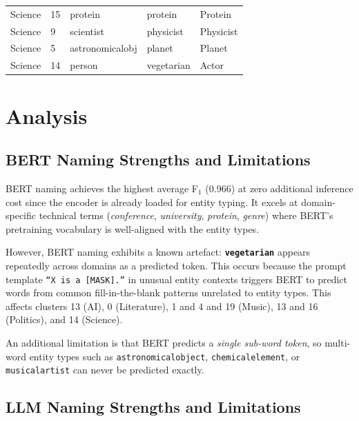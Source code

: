 \documentclass[11pt,a4paper]{article}
\begin{document}
\begin{table}[h]
\begin{tabularx}{\textwidth}{l l X X X}
\midrule
Science    & 15 & protein        & \textcolor{green!60!black}{protein}        & \textcolor{green!60!black}{Protein} \\
Science    & 9  & scientist      & \textcolor{green!60!black}{physicist}      & \textcolor{green!60!black}{Physicist} \\
Science    & 5  & astronomicalobj & \textcolor{green!60!black}{planet}        & \textcolor{green!60!black}{Planet} \\
Science    & 14 & person         & \textcolor{red!70!black}{vegetarian}       & \textcolor{red!70!black}{Actor} \\
\bottomrule
\end{tabularx}
\end{table}

\section{Analysis}

\subsection{BERT Naming Strengths and Limitations}

BERT naming achieves the highest average F$_1$ (0.966) at zero additional
inference cost since the encoder is already loaded for entity typing.
It excels at domain-specific technical terms (\textit{conference},
\textit{university}, \textit{protein}, \textit{genre}) where BERT's
pretraining vocabulary is well-aligned with the entity types.

However, BERT naming exhibits a known artefact: \textbf{\texttt{vegetarian}}
appears repeatedly across domains as a predicted token. This occurs because
the prompt template \texttt{``X is a [MASK].''} in unusual entity contexts
triggers BERT to predict words from common fill-in-the-blank patterns
unrelated to entity types. This affects clusters 13 (AI), 0 (Literature),
1 and 4 and 19 (Music), 13 and 16 (Politics), and 14 (Science).

An additional limitation is that BERT predicts a \emph{single sub-word
token}, so multi-word entity types such as
\texttt{astronomicalobject}, \texttt{chemicalelement}, or
\texttt{musicalartist} can never be predicted exactly.

\subsection{LLM Naming Strengths and Limitations}
\end{document}

